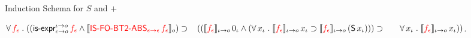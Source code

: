 \documentclass[t,12pt,numbers,fleqn]{beamer}
\newcommand{\syn}[1]{\textcolor{red}{#1}}
\begin{document}
\begin{frame}
    \setcounter{enumi}{28}

    \item Induction Schema for $S$ and $+$

    $\ForallApp \syn{f_\epsilon} \mdot 
    ((\mname{is-expr}_{\epsilon \tarrow o}^{\iota \tarrow o} \, \syn{f_\epsilon} \Andd
    \sembrack{\syn{\mname{IS-FO-BT2-ABS}_{\epsilon \tarrow \epsilon} \, 
    f_\epsilon}}_o) \Implies {} \newline
    \hspace*{2ex}((\sembrack{\syn{f_\epsilon}}_{\iota \tarrow o} \, 0_\iota \Andd
    (\ForallApp x_\iota \mdot 
    \sembrack{\syn{f_\epsilon}}_{\iota \tarrow o} \, x_\iota \Implies
    \sembrack{\syn{f_\epsilon}}_{\iota \tarrow o} \, 
    (\mname{S} \, x_\iota))) \Implies {}\newline
    \hspace*{4ex}\ForallApp x_\iota \mdot 
    \sembrack{\syn{f_\epsilon}}_{\iota \tarrow o} \, x_\iota))$.

  \ee

\ei
\end{frame}

\end{document}
